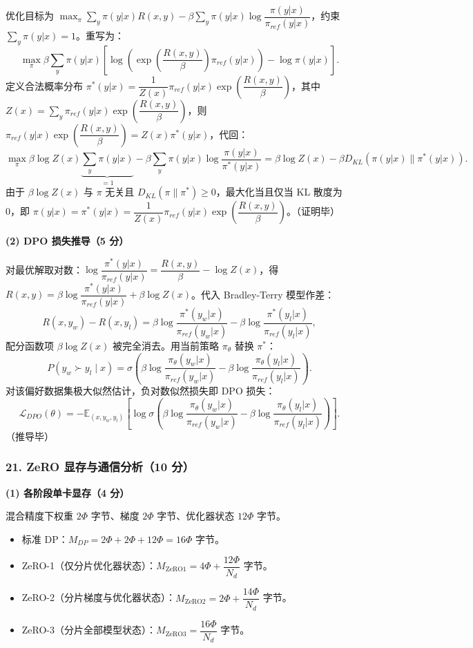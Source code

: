 \documentclass[11pt,a4paper]{article}
\begin{document}
优化目标为 $\max_{\pi}\sum_{y}\pi(y|x)R(x,y)-\beta\sum_{y}\pi(y|x)\log\dfrac{\pi(y|x)}{\pi_{ref}(y|x)}$，约束 $\sum_{y}\pi(y|x)=1$。重写为：
\[
\max_{\pi}\beta\sum_{y}\pi(y|x)\!\left[\log\!\left(\exp\!\left(\frac{R(x,y)}{\beta}\right)\pi_{ref}(y|x)\right)-\log\pi(y|x)\right].
\]
定义合法概率分布 $\pi^*(y|x)=\dfrac{1}{Z(x)}\pi_{ref}(y|x)\exp\!\left(\dfrac{R(x,y)}{\beta}\right)$，其中 $Z(x)=\sum_{y}\pi_{ref}(y|x)\exp\!\left(\dfrac{R(x,y)}{\beta}\right)$，则 $\pi_{ref}(y|x)\exp\!\left(\dfrac{R(x,y)}{\beta}\right)=Z(x)\pi^*(y|x)$，代回：
\[
\max_{\pi}\beta\log Z(x)\underbrace{\sum_{y}\pi(y|x)}_{=1}-\beta\sum_{y}\pi(y|x)\log\frac{\pi(y|x)}{\pi^*(y|x)}
=\beta\log Z(x)-\beta D_{KL}(\pi(y|x)\parallel\pi^*(y|x)).
\]
由于 $\beta\log Z(x)$ 与 $\pi$ 无关且 $D_{KL}(\pi\parallel\pi^*)\ge 0$，最大化当且仅当 KL 散度为 0，即 $\pi(y|x)=\pi^*(y|x)=\dfrac{1}{Z(x)}\pi_{ref}(y|x)\exp\!\left(\dfrac{R(x,y)}{\beta}\right)$。（证明毕）

\noindent\textbf{(2) DPO 损失推导（5 分）}

对最优解取对数：$\log\dfrac{\pi^*(y|x)}{\pi_{ref}(y|x)}=\dfrac{R(x,y)}{\beta}-\log Z(x)$，得 $R(x,y)=\beta\log\dfrac{\pi^*(y|x)}{\pi_{ref}(y|x)}+\beta\log Z(x)$。代入 Bradley-Terry 模型作差：
\[
R(x,y_w)-R(x,y_l)=\beta\log\frac{\pi^*(y_w|x)}{\pi_{ref}(y_w|x)}-\beta\log\frac{\pi^*(y_l|x)}{\pi_{ref}(y_l|x)},
\]
配分函数项 $\beta\log Z(x)$ 被完全消去。用当前策略 $\pi_\theta$ 替换 $\pi^*$：
\[
P(y_w\succ y_l\mid x)=\sigma\!\left(\beta\log\frac{\pi_\theta(y_w|x)}{\pi_{ref}(y_w|x)}-\beta\log\frac{\pi_\theta(y_l|x)}{\pi_{ref}(y_l|x)}\right).
\]
对该偏好数据集极大似然估计，负对数似然损失即 DPO 损失：
\[
\mathcal{L}_{DPO}(\theta)=-\mathbb{E}_{(x,y_w,y_l)}\!\left[\log\sigma\!\left(\beta\log\frac{\pi_\theta(y_w|x)}{\pi_{ref}(y_w|x)}-\beta\log\frac{\pi_\theta(y_l|x)}{\pi_{ref}(y_l|x)}\right)\right].
\]
（推导毕）

\subsubsection*{21. ZeRO 显存与通信分析（10 分）}

\noindent\textbf{(1) 各阶段单卡显存（4 分）}

混合精度下权重 $2\Phi$ 字节、梯度 $2\Phi$ 字节、优化器状态 $12\Phi$ 字节。
\begin{itemize}[leftmargin=2em,itemsep=0pt,parsep=0pt,topsep=0pt]
  \item 标准 DP：$M_{DP}=2\Phi+2\Phi+12\Phi=16\Phi$ 字节。
  \item ZeRO-1（仅分片优化器状态）：$M_{\text{ZeRO1}}=4\Phi+\dfrac{12\Phi}{N_d}$ 字节。
  \item ZeRO-2（分片梯度与优化器状态）：$M_{\text{ZeRO2}}=2\Phi+\dfrac{14\Phi}{N_d}$ 字节。
  \item ZeRO-3（分片全部模型状态）：$M_{\text{ZeRO3}}=\dfrac{16\Phi}{N_d}$ 字节。
\end{itemize}
\end{document}
